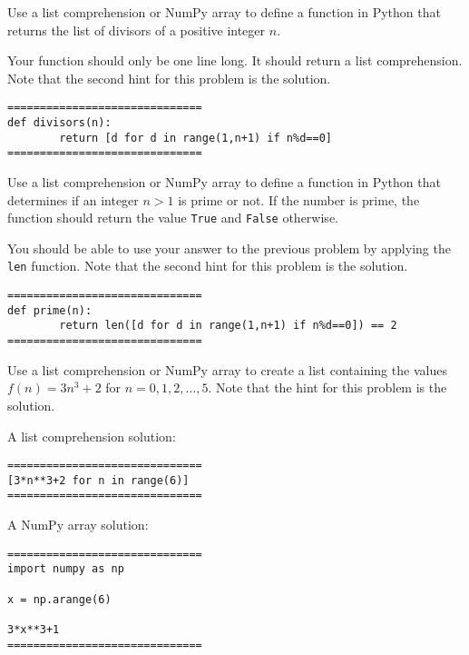 \documentclass{ximera}
\begin{document}
\begin{question}
Use a list comprehension or NumPy array to define a function in Python that returns the list of divisors of a positive integer $n$.
	\begin{hint}
	Your function should only be one line long. It should return a list comprehension. Note that the second hint for this problem is the solution.
	\end{hint}
	\begin{hint}
\begin{verbatim}
==============================
def divisors(n):
        return [d for d in range(1,n+1) if n%d==0]
==============================
\end{verbatim}
	\end{hint}
\end{question}

\begin{question}
Use a list comprehension or NumPy array to define a function in Python that determines if an integer $n>1$ is prime or not. If the number is prime, the function should return the value \verb|True| and \verb|False| otherwise.
	\begin{hint}
	You should be able to use your answer to the previous problem by applying the \verb|len| function. Note that the second hint for this problem is the solution.
	\end{hint}
	\begin{hint}
\begin{verbatim}
==============================
def prime(n):
        return len([d for d in range(1,n+1) if n%d==0]) == 2
==============================
\end{verbatim}
	\end{hint}
\end{question}

\begin{question}
	Use a list comprehension or NumPy array to create a list containing the values $f(n)=3n^3+2$ for $n=0,1,2,\dots,5$. Note that the hint for this problem is the solution.
	\begin{hint}
A list comprehension solution:
\begin{verbatim}
==============================
[3*n**3+2 for n in range(6)]
==============================
\end{verbatim}
A NumPy array solution:
\begin{verbatim}
==============================
import numpy as np

x = np.arange(6)

3*x**3+1
==============================
\end{verbatim}
	\end{hint}
\end{question}
\end{document}
